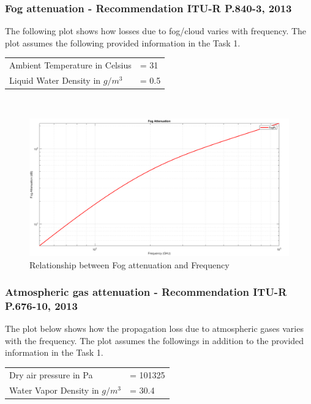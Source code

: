 \documentclass[a4paper,11pt]{article}%
\begin{document}
\subsubsection{Fog attenuation - Recommendation ITU-R P.840-3, 2013\cite{fog}}
The following plot shows how losses due to fog/cloud varies with frequency. The plot assumes the following provided information in the Task 1.\\

\begin{tabular}{l l}
	Ambient Temperature in Celsius&= 31\\
	Liquid Water Density in $g/m^3$&= 0.5\\
\end{tabular}\\

\begin{figure}[!h]
	\centering
	\includegraphics[scale=0.35]{figures/FogPL.png}
	\caption{Relationship between Fog attenuation  and Frequency}
\end{figure}

\subsubsection{Atmospheric gas attenuation - Recommendation ITU-R P.676-10, 2013\cite{gas}}

The plot below shows how the propagation loss due to atmospheric gases varies with the frequency. The plot assumes the followings in addition to the provided information in the Task 1.

\begin{tabular}{l l}
	 Dry air pressure in Pa&= 101325\\
	 Water Vapor Density in $g/m^3$&= 30.4\\
\end{tabular}
\end{document}
